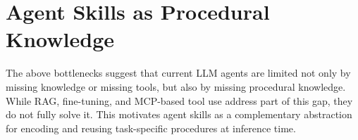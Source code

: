 \documentclass[sigconf,nonacm]{acmart}
\begin{document}



\section{Agent Skills as Procedural Knowledge}
\label{sec:skills}

The above bottlenecks suggest that current LLM agents are limited not only by missing knowledge or missing tools, but also by missing procedural knowledge. While RAG, fine-tuning, and MCP-based tool use address part of this gap, they do not fully solve it. This motivates agent skills as a complementary abstraction for encoding and reusing task-specific procedures at inference time.
\end{document}

